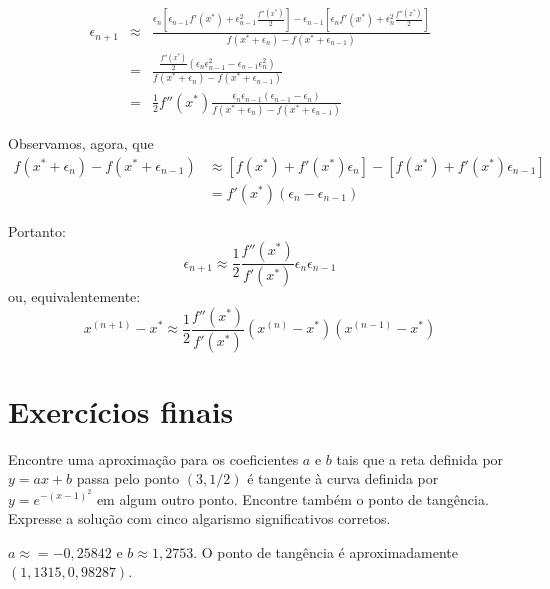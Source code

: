 \begin{resp}
\begin{eqnarray}
\epsilon_{n+1} &\approx&\frac{\epsilon_n \left[\epsilon_{n-1} f'(x^*) + \epsilon_{n-1}^2 \frac{f''(x^*)}{2}\right]-\epsilon_{n-1}\left[\epsilon_{n} f'(x^*) + \epsilon_{n}^2 \frac{f''(x^*)}{2}\right]}{f(x^*+\epsilon_n)-f(x^*+\epsilon_{n-1})}\\
&=&\frac{\frac{f''(x^*)}{2}\left(\epsilon_{n}\epsilon_{n-1}^2-\epsilon_{n-1}\epsilon_{n}^2\right)}{f(x^*+\epsilon_n)-f(x^*+\epsilon_{n-1})}\\
&=&\frac{1}{2}f''(x^*)\frac{\epsilon_{n}\epsilon_{n-1}\left(\epsilon_{n-1}-\epsilon_{n}\right)}{f(x^*+\epsilon_n)-f(x^*+\epsilon_{n-1})}
\end{eqnarray}

Observamos, agora, que
\begin{equation}
  \begin{split}
  f(x^*+\epsilon_n)-f(x^*+\epsilon_{n-1}) &\approx \left[f(x^*)+f'(x^*)\epsilon_n\right]-\left[f(x^*)+f'(x^*)\epsilon_{n-1}\right] \\
  &=f'(x^*)(\epsilon_n-\epsilon_{n-1})
  \end{split}
\end{equation}

Portanto:
\begin{equation}
  \epsilon_{n+1}\approx \frac{1}{2}\frac{f''(x^*)}{f'(x^*)} \epsilon_n \epsilon_{n-1}
\end{equation}
ou, equivalentemente:
\begin{equation}
  x^{(n+1)}-x^*\approx \frac{1}{2}\frac{f''(x^*)}{f'(x^*)} \left(x^{(n)}-x^*\right) \left(x^{(n-1)}-x^*\right)
\end{equation}
\end{resp}

\section{Exercícios finais}

\begin{exer} Encontre uma aproximação para os coeficientes $a$ e $b$ tais que a reta definida por $y = ax + b$ passa pelo ponto $(3, 1/2)$ é tangente à curva definida por $y=e^{-(x-1)^2}$ em algum outro ponto. Encontre também o ponto de tangência. Expresse a solução com cinco algarismo significativos corretos.
\end{exer}
\begin{resp} $a \approx  = -0,25842$ e  $b \approx 1,2753$. O ponto de tangência é aproximadamente $(1,1315, 0,98287)$.
\end{resp}

